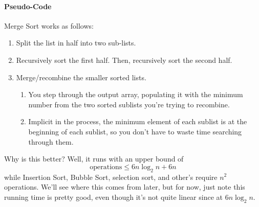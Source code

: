 \documentclass[12pt]{article}
\theoremstyle{plain}
\theoremstyle{definition}
\theoremstyle{remark}
\begin{document}
\paragraph{Pseudo-Code}
Merge Sort works as follows:
\begin{enumerate}
    \item Split the list in half into two sub-lists.
    \item Recursively sort the first half. Then, 
	recursively sort the second half.
    \item Merge/recombine the smaller sorted lists.
	\begin{enumerate}
	    \item You step through the output array, 
        populating it with the minimum 
        number from the two sorted sublists you're
        trying to recombine.
	    \item Implicit in the process, the minimum 
		element of each sublist is at the
		beginning of each sublist, so you don't
		have to waste time searching through them.
	\end{enumerate}
\end{enumerate}
Why is this better? Well, it runs with an upper bound
of 
    \[ \text{operations} \leq 6n \log_2 n + 6n \]
while Insertion Sort, Bubble Sort, selection sort, and 
other's require $n^2$ operations. We'll see where this comes 
from later, but for now, just note this running time
is pretty good, even though it's not quite linear since at $6n \log_2 n$.
\end{document}
